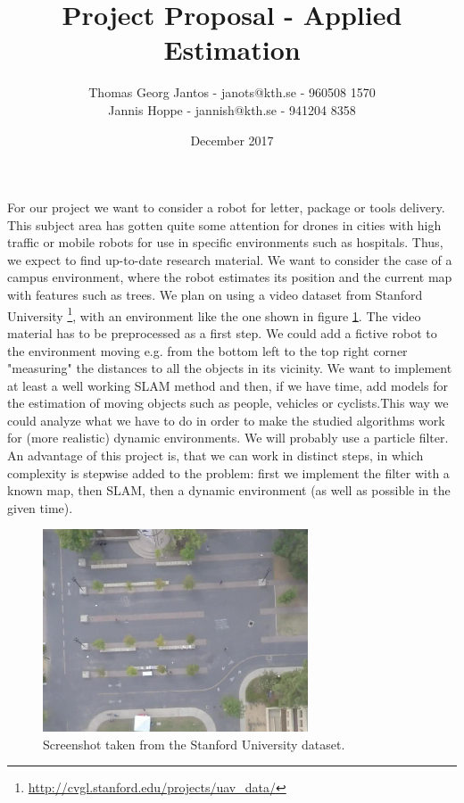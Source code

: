 \documentclass{article}
\title{Project Proposal - Applied Estimation}
\author{Thomas Georg Jantos - janots@kth.se - 960508 1570\\Jannis Hoppe - jannish@kth.se - 941204 8358}
\date{December 2017}
\begin{document}
	
\maketitle
\noindent
	For our project we want to consider a robot for letter, package or tools delivery. This subject area has gotten quite some attention for drones in cities with high traffic or mobile robots for use in specific environments such as hospitals. Thus, we expect to find up-to-date research material. We want to consider the case of a campus environment, where the robot estimates its position and the current map with features such as trees. We plan on using a video dataset from Stanford University \footnote{\label{foot:1}\url{http://cvgl.stanford.edu/projects/uav_data/}}, with an environment like the one shown in figure \ref{fig:Bild1}. The video material has to be preprocessed as a first step. We could add a fictive robot to the environment moving e.g. from the bottom left to the top right corner "measuring" the distances to all the objects in its vicinity. We want to implement at least a well working SLAM method and then, if we have time, add models for the estimation of moving objects such as people, vehicles or cyclists.This way we could analyze what we have to do in order to make the studied algorithms work for (more realistic) dynamic environments. We will probably use a particle filter. An advantage of this project is, that we can work in distinct steps, in which complexity is stepwise added to the problem: first we implement the filter with a known map, then SLAM, then a dynamic environment (as well as possible in the given time).
	
	
	\begin{figure}[htbp] 
		\centering
		\includegraphics[width=0.7\textwidth]{reference.jpg}
		\caption{Screenshot taken from the Stanford University dataset.}
		\label{fig:Bild1}
	\end{figure}
\pagebreak
\end{document}
